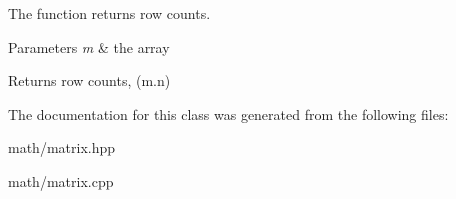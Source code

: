 The function returns row counts. 


\begin{DoxyParams}{Parameters}
{\em m} & the array \\
\hline
\end{DoxyParams}
\begin{DoxyReturn}{Returns}
row counts, (m.\+n) 
\end{DoxyReturn}


The documentation for this class was generated from the following files\+:\begin{DoxyCompactItemize}
\item 
math/matrix.\+hpp\item 
math/matrix.\+cpp\end{DoxyCompactItemize}
